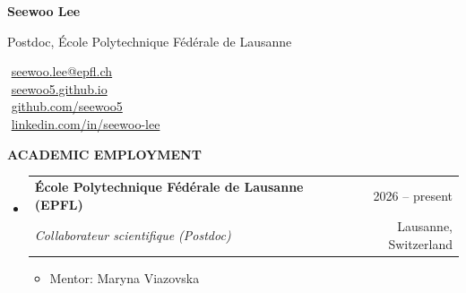 \documentclass[letterpaper,11pt]{article}
\makeatletter
\newcommand{\resitem}[1]{\item #1}
\newcommand{\resheading}[1]{%
  \par\addvspace{10pt}%
  {\sffamily\bfseries\large\color{accent}\MakeUppercase{#1}}\par\nobreak
  \vspace{2pt}{\color{accent!35}\hrule height 0.7pt}\par\nobreak\vspace{5pt}}
\newcommand{\ressubheading}[4]{%
  \par\addvspace{3pt}%
  \begin{tabular*}{\linewidth}{@{}l@{\extracolsep{\fill}}r@{}}
    \textbf{#1} & {\sffamily\small\color{accent}#4} \\
    \textit{#3} & {\small\color{muted}#2} \\
  \end{tabular*}\par\nobreak\vspace{1pt}}
\makeatother
\begin{document}
\begin{minipage}[c]{0.6\linewidth}
  {\sffamily\bfseries\fontsize{26}{28}\selectfont\color{accent}Seewoo Lee}\par\vspace{5pt}
  {\sffamily\large\color{muted}Postdoc, \'{E}cole Polytechnique F\'{e}d\'{e}rale de Lausanne}
\end{minipage}\hfill
\begin{minipage}[c]{0.38\linewidth}
  \raggedleft\small\linespread{1.15}\selectfont
  \faEnvelope\,\,\href{mailto:seewoo.lee@epfl.ch}{seewoo.lee@epfl.ch}\\
  \faHome\,\,\href{https://seewoo5.github.io}{seewoo5.github.io}\\
  \faGithub\,\,\href{https://github.com/seewoo5}{github.com/seewoo5}\\
  \faLinkedinSquare\,\,\href{https://www.linkedin.com/in/seewoo-lee-857062171/}{linkedin.com/in/seewoo-lee}
\end{minipage}
\par\vspace{2pt}

\resheading{Academic Employment}
\begin{itemize}
\item[]
	\ressubheading{\'{E}cole Polytechnique F\'{e}d\'{e}rale de Lausanne (EPFL)}{Lausanne, Switzerland}{Collaborateur scientifique (Postdoc)}{2026 -- present}
	\begin{itemize}
		\resitem{Mentor: Maryna Viazovska}
	\end{itemize}
\end{itemize}
\end{document}
